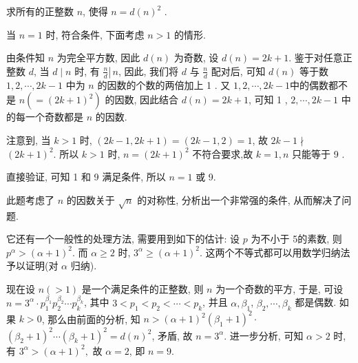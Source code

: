 \begin{example}
	求所有的正整数 $n$, 使得 $n=d(n)^{2}$ .
\end{example}
\begin{solution}
	当 $n=1$ 时, 符合条件, 下面考虑 $n>1$ 的情形.

	由条件知 $n$ 为完全平方数, 因此 $d(n)$ 为奇数, 设 $d(n)=2 k+1$. 鉴于对任意正整数 $d$, 当 $d \mid n$ 时, 有 $\left.\frac{n}{d} \right\rvert\, n$, 因此, 我们将 $d$ 与 $\frac{n}{d}$ 配对后, 可知 $d(n)$ 等于数 $1,2, \cdots, 2 k-1$ 中为 $n$ 的因数的个数的两倍加上 1 . 又 $1,2, \cdots, 2 k-1$中的偶数都不是 $n\left(=(2 k+1)^{2}\right)$ 的因数, 因此结合 $d(n)=2 k+1$, 可知 1 , $2, \cdots, 2 k-1$ 中的每一个奇数都是 $n$ 的因数.

	注意到, 当 $k>1$ 时, $(2 k-1,2 k+1)=(2 k-1,2)=1$, 故 $2 k-1 \nmid$ $(2 k+1)^{2}$. 所以 $k>1$ 时, $n=(2 k+1)^{2}$ 不符合要求,故 $k=1, n$ 只能等于 9 .

	直接验证, 可知 1 和 9 满足条件, 所以 $n=1$ 或 9.
\end{solution}
\begin{note}
	此题考虑了 $n$ 的因数关于 $\sqrt{n}$ 的对称性, 分析出一个非常强的条件, 从而解决了问题.

	它还有一个一般性的处理方法, 需要用到如下的估计: 设 $p$ 为不小于 5的素数, 则 $p^{\alpha}>(\alpha+1)^{2}$. 而 $\alpha \geqslant 2$ 时, $3^{\alpha} \geqslant(\alpha+1)^{2}$. 这两个不等式都可以用数学归纳法予以证明(对 $\alpha$ 归纳).

	现在设 $n(>1)$ 是一个满足条件的正整数, 则 $n$ 为一个奇数的平方, 于是, 可设 $n=3^{\alpha} \cdot p_{1}^{\beta_{1}} p_{2}^{\beta_{2}} \cdots p_{k}^{\beta_{k}}$, 其中 $3<p_{1}<p_{2}<\cdots<p_{k}$, 并且 $\alpha, \beta_{1}$, $\beta_{2}, \cdots, \beta_{k}$ 都是偶数. 如果 $k>0$, 那么由前面的分析, 知 $n>(\alpha+1)^{2}\left(\beta_{1}+1\right)^{2} \cdot$ $\left(\beta_{2}+1\right)^{2} \cdots\left(\beta_{k}+1\right)^{2}=d(n)^{2}$, 矛盾, 故 $n=3^{\alpha}$. 进一步分析, 可知 $\alpha>2$ 时, 有 $3^{\alpha}>(\alpha+1)^{2} , $ 故 $\alpha=2$, 即 $n=9$.
\end{note}

